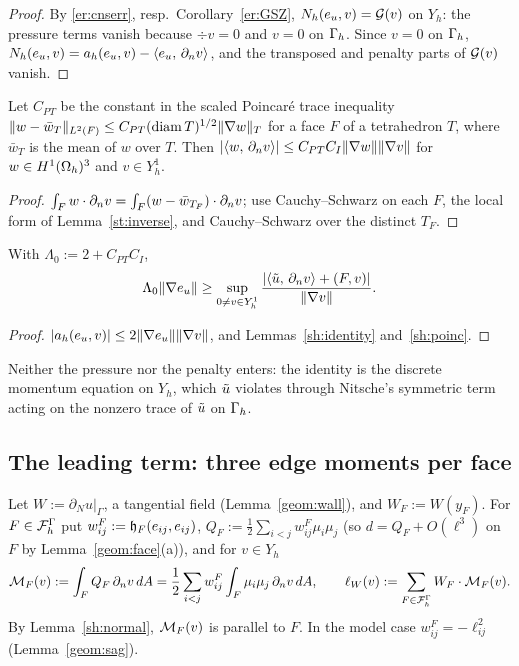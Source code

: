 \begin{proof}
By \eqref{er:cnserr}, resp.\ Corollary~\ref{er:GSZ}, $N_h(e_u,v)=\mathcal G(v)$ on $Y_h$: the pressure terms vanish because $\div v=0$ and $v=0$ on $\Gamma_h$. Since $v=0$ on $\Gamma_h$, $N_h(e_u,v)=a_h(e_u,v)-\langle e_u,\, \partial_n v\rangle$, and the transposed and penalty parts of $\mathcal G(v)$ vanish.
\end{proof}

\begin{lemma}\label{sh:poinc}
Let $C_{PT}$ be the constant in the scaled Poincar\'e trace inequality $\lVert w-\bar w_T\rVert_{L^2(F)}\le C_{PT}(\operatorname{diam} T)^{1/2}\lVert \nabla w\rVert_T$ for a face $F$ of a tetrahedron $T$, where $\bar w_T$ is the mean of $w$ over $T$. Then $|\langle w,\, \partial_n v\rangle|\le C_{PT}C_I\lVert \nabla w\rVert\lVert \nabla v\rVert$ for $w\in H^1(\Omega_h)^3$ and $v\in Y_h^1$.
\end{lemma}

\begin{proof}
$\int_Fw\cdot\partial_n v=\int_F(w-\bar w_{T_F})\cdot\partial_n v$; use Cauchy--Schwarz on each $F$, the local form of Lemma~\ref{st:inverse}, and Cauchy--Schwarz over the distinct $T_F$.
\end{proof}

\begin{corollary}\label{sh:abstract}
With $\Lambda_0:=2+C_{PT}C_I$,
\[
\Lambda_0\lVert \nabla e_u\rVert\ge\sup_{0\ne v\in Y_h^1}\frac{|\langle \tilde u,\, \partial_n v\rangle+(F,v)|}{\lVert \nabla v\rVert} .
\]
\end{corollary}

\begin{proof}
$|a_h(e_u,v)|\le2\lVert \nabla e_u\rVert\lVert \nabla v\rVert$, and Lemmas~\ref{sh:identity} and~\ref{sh:poinc}.
\end{proof}

Neither the pressure nor the penalty enters: the identity is the discrete momentum equation on $Y_h$, which $\tilde u$ violates through Nitsche's symmetric term acting on the nonzero trace of $\tilde u$ on $\Gamma_h$.

\subsection{The leading term: three edge moments per face}
Let $W:=\partial_Nu|_\Gamma$, a tangential field (Lemma~\ref{geom:wall}), and $W_F:=W(y_F)$. For $F\in\mathcal F_h^\Gamma$ put $w^F_{ij}:=\mathfrak h_F(e_{ij},e_{ij})$, $Q_F:=\frac12\sum_{i<j}w^F_{ij}\mu_i\mu_j$ (so $d=Q_F+O(\ell^3)$ on $F$ by Lemma~\ref{geom:face}(a)), and for $v\in Y_h$
\[
\mathcal M_F(v):=\int_FQ_F\,\partial_n v\,dA=\frac12\sum_{i<j}w^F_{ij}\int_F\mu_i\mu_j\,\partial_n v\,dA,\qquad \ell_W(v):=\sum_{F\in\mathcal F_h^\Gamma}W_F\cdot\mathcal M_F(v).
\]
By Lemma~\ref{sh:normal}, $\mathcal M_F(v)$ is parallel to $F$. In the model case $w^F_{ij}=-\ell_{ij}^2$ (Lemma~\ref{geom:sag}).

